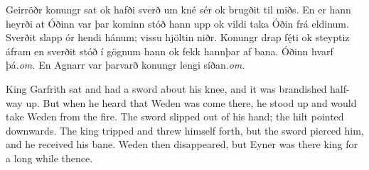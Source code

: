 Geirröðr konungr sat ok hafði sverð um kné sér ok brugðit til miðs. En er hann heyrði at Óðinn var þar kominn stóð hann upp ok vildi taka Óðin frá eldinum. Sverðit slapp ór hendi hánum; vissu hjöltin niðr. Konungr drap fę́ti ok steyptiz áfram en sverðit stóð í gögnum hann ok fekk {hann}{þar af \AM} bana. {Óðinn hvarf þá.}{\emph{om.} \AM} En Agnarr {var þar}{varð \AM} konungr {lengi síðan.}{\emph{om.} \AM}

King Garfrith sat and had a sword about his knee, and it was brandished half-way up. But when he heard that Weden was come there, he stood up and would take Weden from the fire. The sword slipped out of his hand; the hilt pointed downwards. The king tripped and threw himself forth, but the sword pierced him, and he received his bane. Weden then disappeared, but Eyner was there king for a long while thence.
